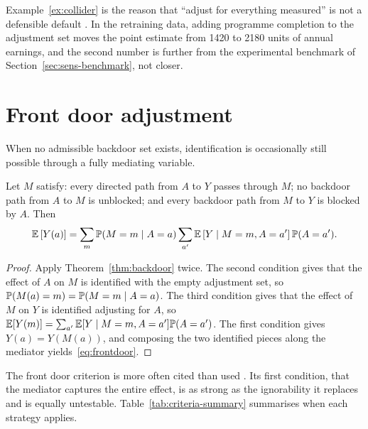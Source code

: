 Example~\ref{ex:collider} is the reason that ``adjust for everything measured''
is not a defensible default \citep{sorensen2013collider}. In the retraining data, adding programme completion
to the adjustment set moves the point estimate from 1420 to 2180 units of annual
earnings, and the second number is further from the experimental benchmark of
Section~\ref{sec:sens-benchmark}, not closer.

\section{Front door adjustment}
\label{sec:graph-frontdoor}

When no admissible backdoor set exists, identification is occasionally still
possible through a fully mediating variable.

\begin{theorem}
\label{thm:frontdoor}
Let $M$ satisfy: every directed path from $A$ to $Y$ passes through $M$; no
backdoor path from $A$ to $M$ is unblocked; and every backdoor path from $M$ to
$Y$ is blocked by $A$. Then
\begin{equation}
  \mathbb{E}\left[ Y(a) \right] = \sum_m \mathbb{P}(M = m \mid A = a)
    \sum_{a'} \mathbb{E}\left[ Y \mid M = m, A = a' \right] \mathbb{P}(A = a').
  \label{eq:frontdoor}
\end{equation}
\end{theorem}

\begin{proof}
Apply Theorem~\ref{thm:backdoor} twice. The second condition gives that the
effect of $A$ on $M$ is identified with the empty adjustment set, so
$\mathbb{P}(M(a) = m) = \mathbb{P}(M = m \mid A = a)$. The third condition gives that the
effect of $M$ on $Y$ is identified adjusting for $A$, so
$\mathbb{E}[Y(m)] = \sum_{a'} \mathbb{E}[Y \mid M = m, A = a'] \mathbb{P}(A = a')$. The first
condition gives $Y(a) = Y(M(a))$, and composing the two identified pieces along
the mediator yields~\eqref{eq:frontdoor}.
\end{proof}

The front door criterion is more often cited than used
\citep{weiss2020frontdoor}. Its first condition,
that the mediator captures the entire effect, is as strong as the ignorability
it replaces and is equally untestable. Table~\ref{tab:criteria-summary}
summarises when each strategy applies.

